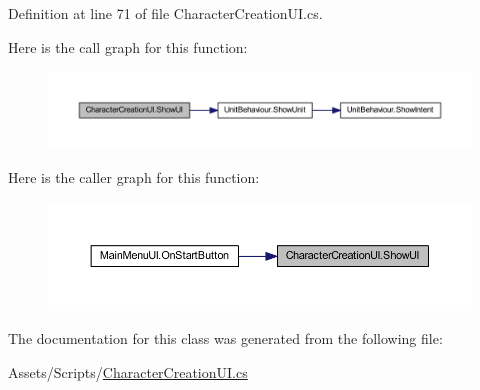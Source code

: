 Definition at line 71 of file Character\+Creation\+U\+I.\+cs.

Here is the call graph for this function\+:
\nopagebreak
\begin{figure}[H]
\begin{center}
\leavevmode
\includegraphics[width=350pt]{class_character_creation_u_i_a5e683c30d28a4c97d8f84de3de2062cd_cgraph}
\end{center}
\end{figure}
Here is the caller graph for this function\+:
\nopagebreak
\begin{figure}[H]
\begin{center}
\leavevmode
\includegraphics[width=350pt]{class_character_creation_u_i_a5e683c30d28a4c97d8f84de3de2062cd_icgraph}
\end{center}
\end{figure}


The documentation for this class was generated from the following file\+:\begin{DoxyCompactItemize}
\item 
Assets/\+Scripts/\mbox{\hyperlink{_character_creation_u_i_8cs}{Character\+Creation\+U\+I.\+cs}}\end{DoxyCompactItemize}
